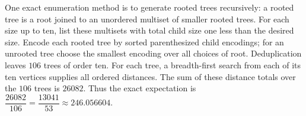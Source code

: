 One exact enumeration method is to generate rooted trees recursively: a rooted tree is a root joined to an unordered multiset of smaller rooted trees. For each size up to ten, list these multisets with total child size one less than the desired size. Encode each rooted tree by sorted parenthesized child encodings; for an unrooted tree choose the smallest encoding over all choices of root. Deduplication leaves $106$ trees of order ten. For each tree, a breadth-first search from each of its ten vertices supplies all ordered distances. The sum of these distance totals over the $106$ trees is $26082$. Thus the exact expectation is $\dfrac{26082}{106}=\dfrac{13041}{53}\approx\boxed{246.056604}$.
